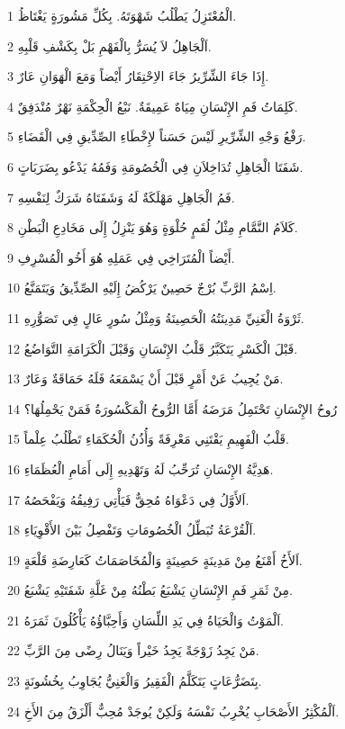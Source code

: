 \par 1 الْمُعْتَزِلُ يَطْلُبُ شَهْوَتَهُ. بِكُلِّ مَشُورَةٍ يَغْتَاظُ.
\par 2 اَلْجَاهِلُ لاَ يُسَرُّ بِالْفَهْمِ بَلْ بِكَشْفِ قَلْبِهِ.
\par 3 إِذَا جَاءَ الشِّرِّيرُ جَاءَ الاِحْتِقَارُ أَيْضاً وَمَعَ الْهَوَانِ عَارٌ.
\par 4 كَلِمَاتُ فَمِ الإِنْسَانِ مِيَاهٌ عَمِيقَةٌ. نَبْعُ الْحِكْمَةِ نَهْرٌ مُنْدَفِقٌ.
\par 5 رَفْعُ وَجْهِ الشِّرِّيرِ لَيْسَ حَسَناً لإِخْطَاءِ الصِّدِّيقِ فِي الْقَضَاءِ.
\par 6 شَفَتَا الْجَاهِلِ تُدَاخِلاَنِ فِي الْخُصُومَةِ وَفَمُهُ يَدْعُو بِضَرَبَاتٍ.
\par 7 فَمُ الْجَاهِلِ مَهْلَكَةٌ لَهُ وَشَفَتَاهُ شَرَكٌ لِنَفْسِهِ.
\par 8 كَلاَمُ النَّمَّامِ مِثْلُ لُقَمٍ حُلْوَةٍ وَهُوَ يَنْزِلُ إِلَى مَخَادِعِ الْبَطْنِ.
\par 9 أَيْضاً الْمُتَرَاخِي فِي عَمَلِهِ هُوَ أَخُو الْمُسْرِفِ.
\par 10 اِسْمُ الرَّبِّ بُرْجٌ حَصِينٌ يَرْكُضُ إِلَيْهِ الصِّدِّيقُ وَيَتَمَنَّعُ.
\par 11 ثَرْوَةُ الْغَنِيِّ مَدِينَتُهُ الْحَصِينَةُ وَمِثْلُ سُورٍ عَالٍ فِي تَصَوُّرِهِ.
\par 12 قَبْلَ الْكَسْرِ يَتَكَبَّرُ قَلْبُ الإِنْسَانِ وَقَبْلَ الْكَرَامَةِ التَّوَاضُعُ.
\par 13 مَنْ يُجِيبُ عَنْ أَمْرٍ قَبْلَ أَنْ يَسْمَعَهُ فَلَهُ حَمَاقَةٌ وَعَارٌ.
\par 14 رُوحُ الإِنْسَانِ تَحْتَمِلُ مَرَضَهُ أَمَّا الرُّوحُ الْمَكْسُورَةُ فَمَنْ يَحْمِلُهَا؟
\par 15 قَلْبُ الْفَهِيمِ يَقْتَنِي مَعْرِفَةً وَأُذُنُ الْحُكَمَاءِ تَطْلُبُ عِلْماً.
\par 16 هَدِيَّةُ الإِنْسَانِ تُرَحِّبُ لَهُ وَتَهْدِيهِ إِلَى أَمَامِ الْعُظَمَاءِ.
\par 17 اَلأَوَّلُ فِي دَعْوَاهُ مُحِقٌّ فَيَأْتِي رَفِيقُهُ وَيَفْحَصُهُ.
\par 18 اَلْقُرْعَةُ تُبَطِّلُ الْخُصُومَاتِ وَتَفْصِلُ بَيْنَ الأَقْوِيَاءِ.
\par 19 اَلأَخُ أَمْنَعُ مِنْ مَدِينَةٍ حَصِينَةٍ وَالْمُخَاصَمَاتُ كَعَارِضَةِ قَلْعَةٍ.
\par 20 مِنْ ثَمَرِ فَمِ الإِنْسَانِ يَشْبَعُ بَطْنُهُ مِنْ غَلَّةِ شَفَتَيْهِ يَشْبَعُ.
\par 21 اَلْمَوْتُ وَالْحَيَاةُ فِي يَدِ اللِّسَانِ وَأَحِبَّاؤُهُ يَأْكُلُونَ ثَمَرَهُ.
\par 22 مَنْ يَجِدُ زَوْجَةً يَجِدُ خَيْراً وَيَنَالُ رِضًى مِنَ الرَّبِّ.
\par 23 بِتَضَرُّعَاتٍ يَتَكَلَّمُ الْفَقِيرُ وَالْغَنِيُّ يُجَاوِبُ بِخُشُونَةٍ.
\par 24 اَلْمُكْثِرُ الأَصْحَابِ يُخْرِبُ نَفْسَهُ وَلَكِنْ يُوجَدْ مُحِبٌّ أَلْزَقُ مِنَ الأَخِ.

